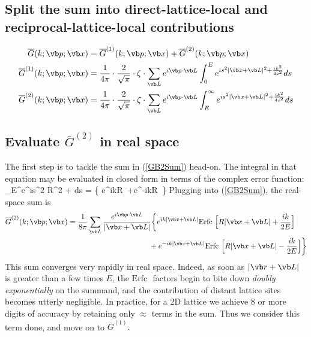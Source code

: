 \documentclass[letterpaper]{article}
\newcommand{\GB}{\overline{G}}
\newcommand{\erfc}{\text{Erfc }}
\begin{document}
\subsection*{Split the sum into direct-lattice-local and reciprocal-lattice-local
             contributions}

\begin{align}
\GB(k; \vb p; \vb x) 
 &= \GB^{(1)}(k; \vb p; \vb x) 
   +\GB^{(2)}(k; \vb p; \vb x) 
\label{GBDecomposition}
\\
\GB^{(1)}(k; \vb p; \vb x) 
&= \frac{1}{4\pi} \cdot \frac{2}{\sqrt{\pi}}\cdot \zeta\cdot
   \sum_{\vb L} e^{i\vb p \cdot \vb L} 
                \int_0^E e^{is^2 |\vb x+\vb L|^2 + \frac{ik^2}{4s^2}} ds
\label{GB1Sum}
\\
\GB^{(2)}(k; \vb p; \vb x) 
&= \frac{1}{4\pi} \cdot \frac{2}{\sqrt{\pi}}\cdot\zeta\cdot
   \sum_{\vb L} e^{i\vb p \cdot \vb L} 
                \int_E^\infty e^{is^2 |\vb x + \vb L|^2 + \frac{ik^2}{4s^2}} ds
\label{GB2Sum}
\end{align}

\subsection*{Evaluate $\GB^{(2)}$ in real space} 

The first step is to tackle the sum in (\ref{GB2Sum}) head-on. 
The integral in that equation may be evaluated in closed form in terms of
the complex error function:
{
  \cdot \zeta \int_E^\infty e^{is^2 R^2 + } ds
 = \bigg\{ e^{ikR} \,\erfc{}
                     +e^{-ikR} \,\erfc{}
               \bigg\}
}
Plugging into (\ref{GB2Sum}), the real-space sum is 
\begin{align*}
\GB^{(2)}(k; \vb p; \vb x) 
&= \frac{1}{8\pi}
   \sum_{\vb L} 
   \frac{e^{i\vb p \cdot \vb L}}{|\vb x + \vb L|}
    \bigg\{ e^{ik|\vb x + \vb L|}
            \erfc\Big[R|\vb x + \vb L| + \frac{ik}{2E} \Big]
\\
&\hspace{1.5in}
 +          e^{-ik|\vb x + \vb L|}
    \erfc\Big[R|\vb x + \vb L| - \frac{ik}{2E} \Big]
    \bigg\}
\end{align*}
This sum converges very rapidly in real space. Indeed, as soon as 
$|\vb r + \vb L|$ is greater than a few times $E$, the $\erfc$\!\!
factors begin to bite down \textit{doubly exponentially} on the
summand, and the contribution of distant lattice sites becomes 
utterly negligible. In practice, for a 2D lattice we achieve 8 
or more digits of accuracy by retaining only $\approx$ terms in the sum.
Thus we consider this term done, and move on to $\GB^{(1)}.$ 
\end{document}
